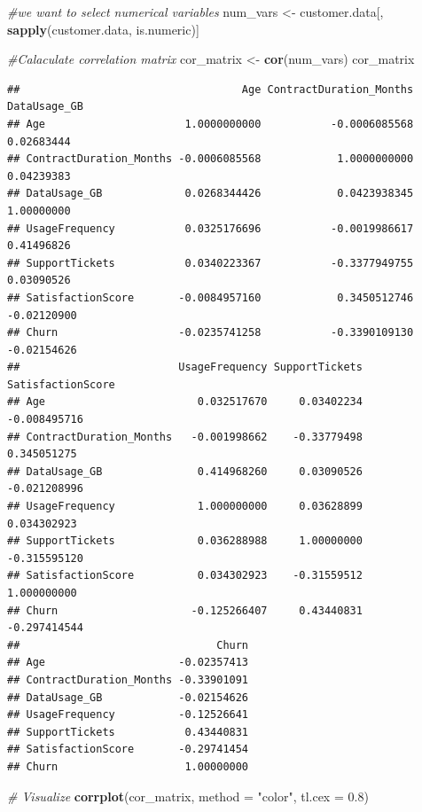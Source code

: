 \documentclass[
]{article}
\newenvironment{Shaded}{\begin{snugshade}}{\end{snugshade}}
\newcommand{\AttributeTok}[1]{\textcolor[rgb]{0.13,0.29,0.53}{#1}}
\newcommand{\CommentTok}[1]{\textcolor[rgb]{0.56,0.35,0.01}{\textit{#1}}}
\newcommand{\FloatTok}[1]{\textcolor[rgb]{0.00,0.00,0.81}{#1}}
\newcommand{\FunctionTok}[1]{\textcolor[rgb]{0.13,0.29,0.53}{\textbf{#1}}}
\newcommand{\NormalTok}[1]{#1}
\newcommand{\OtherTok}[1]{\textcolor[rgb]{0.56,0.35,0.01}{#1}}
\newcommand{\StringTok}[1]{\textcolor[rgb]{0.31,0.60,0.02}{#1}}
\begin{document}
\begin{Shaded}
\begin{Highlighting}[]
\CommentTok{\#we want to select numerical variables }
\NormalTok{num\_vars }\OtherTok{\textless{}{-}}\NormalTok{ customer.data[, }\FunctionTok{sapply}\NormalTok{(customer.data, is.numeric)]}

\CommentTok{\#Calaculate correlation matrix}
\NormalTok{cor\_matrix }\OtherTok{\textless{}{-}} \FunctionTok{cor}\NormalTok{(num\_vars)}
\NormalTok{cor\_matrix}
\end{Highlighting}
\end{Shaded}

\begin{verbatim}
##                                   Age ContractDuration_Months DataUsage_GB
## Age                      1.0000000000           -0.0006085568   0.02683444
## ContractDuration_Months -0.0006085568            1.0000000000   0.04239383
## DataUsage_GB             0.0268344426            0.0423938345   1.00000000
## UsageFrequency           0.0325176696           -0.0019986617   0.41496826
## SupportTickets           0.0340223367           -0.3377949755   0.03090526
## SatisfactionScore       -0.0084957160            0.3450512746  -0.02120900
## Churn                   -0.0235741258           -0.3390109130  -0.02154626
##                         UsageFrequency SupportTickets SatisfactionScore
## Age                        0.032517670     0.03402234      -0.008495716
## ContractDuration_Months   -0.001998662    -0.33779498       0.345051275
## DataUsage_GB               0.414968260     0.03090526      -0.021208996
## UsageFrequency             1.000000000     0.03628899       0.034302923
## SupportTickets             0.036288988     1.00000000      -0.315595120
## SatisfactionScore          0.034302923    -0.31559512       1.000000000
## Churn                     -0.125266407     0.43440831      -0.297414544
##                               Churn
## Age                     -0.02357413
## ContractDuration_Months -0.33901091
## DataUsage_GB            -0.02154626
## UsageFrequency          -0.12526641
## SupportTickets           0.43440831
## SatisfactionScore       -0.29741454
## Churn                    1.00000000
\end{verbatim}

\begin{Shaded}
\begin{Highlighting}[]
\CommentTok{\# Visualize}
\FunctionTok{corrplot}\NormalTok{(cor\_matrix, }\AttributeTok{method =} \StringTok{"color"}\NormalTok{, }\AttributeTok{tl.cex =} \FloatTok{0.8}\NormalTok{)}
\end{Highlighting}
\end{Shaded}
\end{document}
